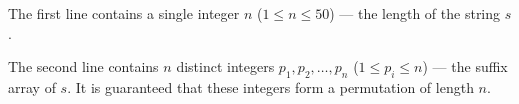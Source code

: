 The first line contains a single integer $n$ ($1 \le n \le 50$) --- the length of the string $s$.

The second line contains $n$ distinct integers $p_1, p_2, \dots, p_n$ ($1 \le p_i \le n$) --- the suffix array of $s$. It is guaranteed that these integers form a permutation of length $n$.
